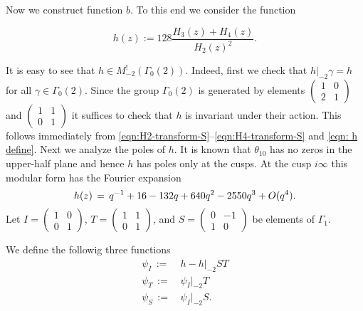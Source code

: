 Now we construct function $b$. To this end we consider the function
\begin{definition}\label{def: h}
\begin{equation}\label{eqn: h define}
    h(z) := 128 \frac{H_3(z) + H_4(z)}{H_2(z)^2}.
\end{equation}
\end{definition}
It is easy to see that $h\in M^!_{-2}(\Gamma_0(2))$. Indeed, first we check that $h|_{-2}\gamma=h$
for all $\gamma\in\Gamma_0(2)$. Since the group $\Gamma_0(2)$ is generated by elements
$\left(\begin{smallmatrix}1&0\\2&1\end{smallmatrix}\right)$ and $\left(\begin{smallmatrix}1&1\\0&1\end{smallmatrix}\right)$
it suffices to check that $h$ is invariant under their action. This follows immediately
from \eqref{eqn:H2-transform-S}--\eqref{eqn:H4-transform-S} and \eqref{eqn: h define}. Next we analyze the poles of $h$.
It is known \cite[Chapter~I Lemma~4.1]{Mumford} that $\theta_{10}$ has no zeros in the upper-half plane and hence $h$ has poles only at the cusps.
At the cusp $i\infty$ this modular form has the Fourier expansion
\begin{equation}
h(z)\,=\,q^{-1} + 16 - 132 q + 640 q^2 - 2550 q^3+O(q^4).\notag
\end{equation}
Let $I=\left(\begin{smallmatrix}1&0\\0&1\end{smallmatrix}\right)$,
$T=\left(\begin{smallmatrix}1&1\\0&1\end{smallmatrix}\right)$, and
$S=\left(\begin{smallmatrix}0&-1\\1&0\end{smallmatrix}\right)$ be elements of $\Gamma_1$.
\begin{definition}\label{def: psi I psi T psi S}
We define the followig three functions
\begin{align}
    \psi_I\,:=\,&h-h|_{-2}ST \label{eqn: psi I define}\\
    \psi_T\,:=\,&\psi_I|_{-2}T \label{eqn: psi T define}\\
    \psi_S\,:=\,&\psi_I|_{-2}S. \label{eqn: psi S define}
\end{align}
\end{definition}

